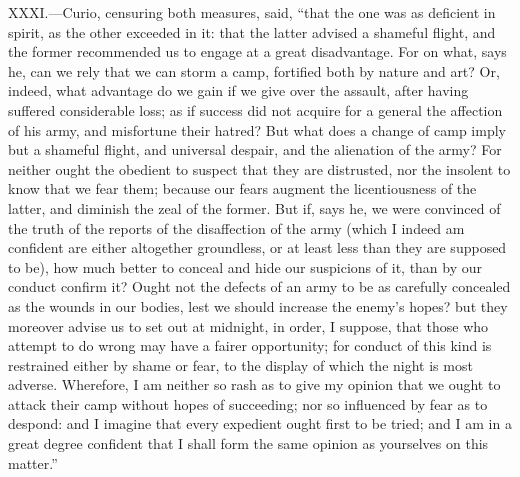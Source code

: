 XXXI.—Curio, censuring both measures, said, ``that the one was as
deficient in spirit, as the other exceeded in it: that the latter
advised a shameful flight, and the former recommended us to engage at a
great disadvantage. For on what, says he, can we rely that we can storm
a camp, fortified both by nature and art? Or, indeed, what advantage do
we gain if we give over the assault, after having suffered considerable
loss; as if success did not acquire for a general the affection of his
army, and misfortune their hatred? But what does a change of camp imply
but a shameful flight, and universal despair, and the alienation of the
army? For neither ought the obedient to suspect that they are
distrusted, nor the insolent to know that we fear them; because our
fears augment the licentiousness of the latter, and diminish the zeal of
the former. But if, says he, we were convinced of the truth of the
reports of the disaffection of the army (which I indeed am confident are
either altogether groundless, or at least less than they are supposed to
be), how much better to conceal and hide our suspicions of it, than by
our conduct confirm it? Ought not the defects of an army to be as
carefully concealed as the wounds in our bodies, lest we should increase
the enemy's hopes? but they moreover advise us to set out at midnight,
in order, I suppose, that those who attempt to do wrong may have a
fairer opportunity; for conduct of this kind is restrained either by
shame or fear, to the display of which the night is most adverse.
Wherefore, I am neither so rash as to give my opinion that we ought to
attack their camp without hopes of succeeding; nor so influenced by fear
as to despond: and I imagine that every expedient ought first to be
tried; and I am in a great degree confident that I shall form the same
opinion as yourselves on this matter.''

